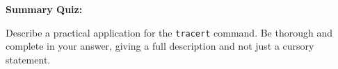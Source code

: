 \vfil \eject

\noindent
{\bf Summary Quiz:}

Describe a practical application for the {\tt tracert} command.  Be thorough and complete in your answer, giving a full description and not just a cursory statement.




